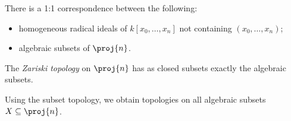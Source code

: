 \documentclass{article}
\begin{document}
\begin{corollary}
  There is a 1:1 correspondence between the following:
  \begin{itemize}
    \item homogeneous radical ideals of $k[x_0,\ldots,x_n]$ not containing $(x_0,\ldots,x_n)$;
    \item algebraic subsets of $\proj{n}$.
  \end{itemize}
\end{corollary}

\begin{definition}
  The \emph{Zariski topology} on $\proj{n}$ has as closed subsets exactly the algebraic
  subsets.

  Using the subset topology, we obtain topologies on all algebraic subsets $X\subseteq \proj{n}$.
\end{definition}
\end{document}
